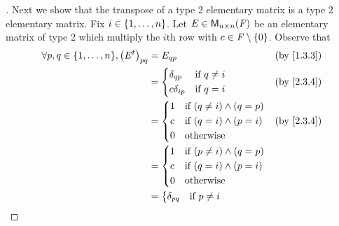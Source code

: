 \begin{proof}[]
	Next we show that the transpose of a type 2 elementary matrix is a type 2 elementary matrix.
	Fix \(i \in \left\lbrace1, \dots, n\right\rbrace\).
	Let \(E \in \ms[n][n][\F]\) be an elementary matrix of type 2 which multiply the \(i\)th row with \(c \in \mathit{F} \setminus \left\lbrace0\right\rbrace\).
	Observe that
	\begin{align*}
		\forall p, q \in \set{1, \dots, n}, \pa{\tp{E}}_{p q} & = E_{q p}                                  &  & \by{1.3.3} \\
		                                                      & = \begin{dcases}
			                                                          \delta_{q p}   & \text{if } q \neq i \\
			                                                          c \delta_{i p} & \text{if } q = i
		                                                          \end{dcases}    &  & \by{2.3.4}                     \\
		                                                      & = \begin{dcases}
			                                                          1 & \text{if } (q \neq i) \land (q = p) \\
			                                                          c & \text{if } (q = i) \land (p = i)    \\
			                                                          0 & \text{otherwise}
		                                                          \end{dcases} &  & \by{2.3.4}                  \\
		                                                      & = \begin{dcases}
			                                                          1 & \text{if } (p \neq i) \land (q = p) \\
			                                                          c & \text{if } (q = i) \land (p = i)    \\
			                                                          0 & \text{otherwise}
		                                                          \end{dcases}                  \\
		                                                      & = \begin{dcases}
			                                                          \delta_{p q}   & \text{if } p \neq i \\

\end{dcases}
\end{align*}
\end{proof}
